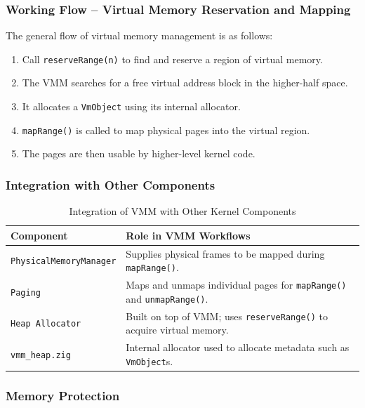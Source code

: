 \documentclass[12pt]{extarticle}
\begin{document}
\subsubsection*{Working Flow – Virtual Memory Reservation and Mapping}

\noindent
The general flow of virtual memory management is as follows:
\begin{enumerate}
  \item Call \texttt{reserveRange(n)} to find and reserve a region of virtual memory.
  \item The VMM searches for a free virtual address block in the higher-half space.
  \item It allocates a \texttt{VmObject} using its internal allocator.
  \item \texttt{mapRange()} is called to map physical pages into the virtual region.
  \item The pages are then usable by higher-level kernel code.
\end{enumerate}

\subsubsection*{Integration with Other Components}

\begin{table}[H]
\centering
\begin{tabular}{|l|p{10cm}|}
\hline
\textbf{Component} & \textbf{Role in VMM Workflows} \\
\hline
\texttt{PhysicalMemoryManager} & Supplies physical frames to be mapped during \texttt{mapRange()}. \\
\texttt{Paging} & Maps and unmaps individual pages for \texttt{mapRange()} and \texttt{unmapRange()}. \\
\texttt{Heap Allocator} & Built on top of VMM; uses \texttt{reserveRange()} to acquire virtual memory. \\
\texttt{vmm\_heap.zig} & Internal allocator used to allocate metadata such as \texttt{VmObject}s. \\
\hline
\end{tabular}
\caption{Integration of VMM with Other Kernel Components}
\label{tab:vmm_components}
\end{table}



\subsubsection*{Memory Protection}
\end{document}
